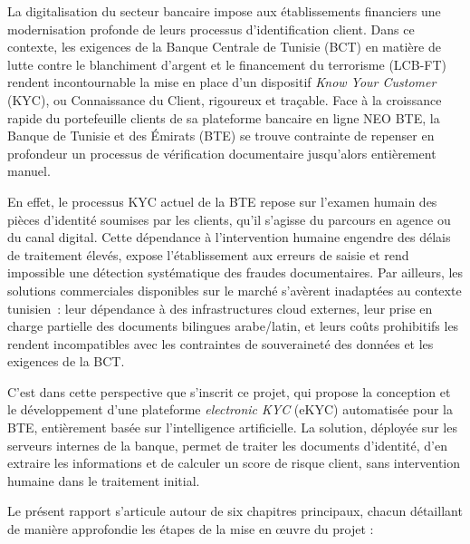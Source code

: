 \documentclass[12pt,a4paper]{report}
\begin{document}
La digitalisation du secteur bancaire impose aux établissements financiers une modernisation profonde de leurs processus d'identification client. Dans ce contexte, les exigences de la Banque Centrale de Tunisie (BCT) en matière de lutte contre le blanchiment d'argent et le financement du terrorisme (LCB-FT) rendent incontournable la mise en place d'un dispositif \textit{Know Your Customer} (KYC), ou Connaissance du Client, rigoureux et traçable. Face à la croissance rapide du portefeuille clients de sa plateforme bancaire en ligne NEO BTE, la Banque de Tunisie et des Émirats (BTE) se trouve contrainte de repenser en profondeur un processus de vérification documentaire jusqu'alors entièrement manuel.

En effet, le processus KYC actuel de la BTE repose sur l'examen humain des pièces d'identité soumises par les clients, qu'il s'agisse du parcours en agence ou du canal digital. Cette dépendance à l'intervention humaine engendre des délais de traitement élevés, expose l'établissement aux erreurs de saisie et rend impossible une détection systématique des fraudes documentaires. Par ailleurs, les solutions commerciales disponibles sur le marché s'avèrent inadaptées au contexte tunisien~: leur dépendance à des infrastructures cloud externes, leur prise en charge partielle des documents bilingues arabe/latin, et leurs coûts prohibitifs les rendent incompatibles avec les contraintes de souveraineté des données et les exigences de la BCT.

C'est dans cette perspective que s'inscrit ce projet, qui propose la conception et le développement d'une plateforme \textit{electronic KYC} (eKYC) automatisée pour la BTE, entièrement basée sur l'intelligence artificielle. La solution, déployée sur les serveurs internes de la banque, permet de traiter les documents d'identité, d'en extraire les informations et de calculer un score de risque client, sans intervention humaine dans le traitement initial.

Le présent rapport s'articule autour de six chapitres principaux, chacun détaillant de manière approfondie les étapes de la mise en œuvre du projet :
\end{document}
